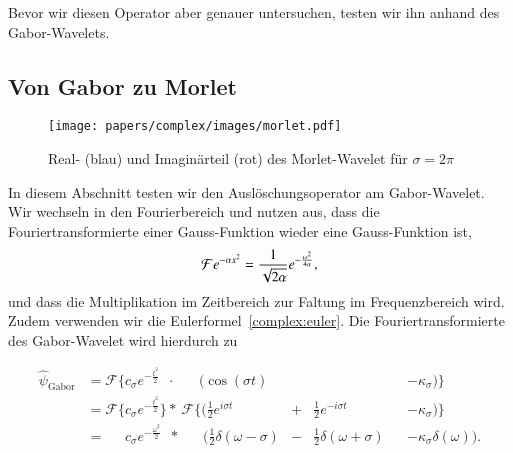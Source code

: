 Bevor wir diesen Operator aber genauer untersuchen, testen wir ihn anhand des Gabor-Wavelets.

\subsection{Von Gabor zu Morlet}
\label{complex:gabor-to-morlet}

\begin{figure}
	\centering
	\texttt{[image: papers/complex/images/morlet.pdf]}
	\caption{Real- (blau) und Imaginärteil (rot) des Morlet-Wavelet für $\sigma = 2\pi$ \label{complex:morlet}}
\end{figure}

In diesem Abschnitt testen wir den Auslöschungsoperator am Gabor-Wavelet.
Wir wechseln in den Fourierbereich und nutzen aus, dass die Fouriertransformierte einer Gauss-Funktion wieder eine Gauss-Funktion ist,
\[
	\Four e^{-\alpha x^2} 
	= \frac{1}{\sqrt{2\alpha}}e^{- \frac{\omega^2}{4\alpha}},
\]
und dass die Multiplikation im Zeitbereich zur Faltung im Frequenzbereich wird.
Zudem verwenden wir die Eulerformel~\eqref{complex:euler}.
Die Fouriertransformierte des Gabor-Wavelet wird hierdurch zu

\begin{equation*}
\begin{aligned}
 \hat{\psi}_\text{Gabor}
 & = \mathcal{F}\Bigg\lbrace c_\sigma e^{-\frac{t^2}{2}}\phantom{\Bigg\rbrace}
 \cdot\; \phantom{\mathcal{F}\Bigg\lbrace}
 \Bigg(\cos\left(\sigma t\right) &&
 &&- \kappa_\sigma\Bigg) \Bigg\rbrace \\
 & = \mathcal{F}\Bigg\lbrace c_\sigma e^{-\frac{t^2}{2}} \Bigg\rbrace 
 *\: \mathcal{F}\Bigg\lbrace\Bigg( \frac12 e^{i\sigma t} &+& \frac12 e^{-i\sigma t}
 &&- \kappa_\sigma \Bigg)\Bigg\rbrace\\
 & = \phantom{\mathcal{F}\Bigg\lbrace} c_\sigma e^{- \frac{\omega^2}{2}} \phantom{\Big\rbrace}
 *\:\phantom{\mathcal{F}\Bigg\lbrace} \Bigg(
  \frac{1}{2}\delta(\omega - \sigma) &-&
  \frac{1}{2}\delta(\omega + \sigma) 
 && - \kappa_\sigma\delta(\omega)
  \Bigg).
\end{aligned}
\end{equation*}

